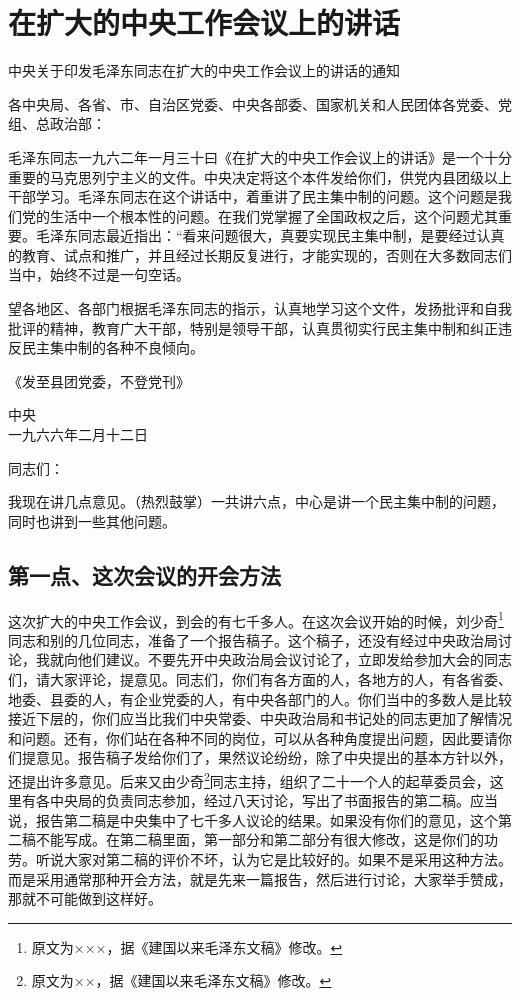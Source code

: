 \section[在扩大的中央工作会议上的讲话（一九六二年一月三十日）]{在扩大的中央工作会议上的讲话}

\begin{yinyong}
{\noindent\Large\centering 中央关于印发毛泽东同志在扩大的中央工作会议上的讲话的通知 \par}

各中央局、各省、市、自治区党委、中央各部委、国家机关和人民团体各党委、党组、总政治部：

毛泽东同志一九六二年一月三十曰《在扩大的中央工作会议上的讲话》是一个十分重要的马克思列宁主义的文件。中央决定将这个本件发给你们，供党内县团级以上干部学习。毛泽东同志在这个讲话中，着重讲了民主集中制的问题。这个问题是我们党的生活中一个根本性的问题。在我们党掌握了全国政权之后，这个问题尤其重要。毛泽东同志最近指出：“看来问题很大，真要实现民主集中制，是要经过认真的教育、试点和推广，并且经过长期反复进行，才能实现的，否则在大多数同志们当中，始终不过是一句空话。

望各地区、各部门根据毛泽东同志的指示，认真地学习这个文件，发扬批评和自我批评的精神，教育广大干部，特别是领导干部，认真贯彻实行民主集中制和纠正违反民主集中制的各种不良倾向。

《发至县团党委，不登党刊》

{\raggedleft 中央\\一九六六年二月十二日\par}
\end{yinyong}

{\noindent 同志们：}

我现在讲几点意见。（热烈鼓掌）一共讲六点，中心是讲一个民主集中制的问题，同时也讲到一些其他问题。

\subsection{第一点、这次会议的开会方法}

这次扩大的中央工作会议，到会的有七千多人。在这次会议开始的时候，刘少奇\footnote{原文为×××，据《建国以来毛泽东文稿》修改。}同志和别的几位同志，准备了一个报告稿子。这个稿子，还没有经过中央政治局讨论，我就向他们建议。不要先开中央政治局会议讨论了，立即发给参加大会的同志们，请大家评论，提意见。同志们，你们有各方面的人，各地方的人，有各省委、地委、县委的人，有企业党委的人，有中央各部门的人。你们当中的多数人是比较接近下层的，你们应当比我们中央常委、中央政治局和书记处的同志更加了解情况和问题。还有，你们站在各种不同的岗位，可以从各种角度提出问题，因此要请你们提意见。报告稿子发给你们了，果然议论纷纷，除了中央提出的基本方针以外，还提出许多意见。后来又由少奇\footnote{原文为××，据《建国以来毛泽东文稿》修改。}同志主持，组织了二十一个人的起草委员会，这里有各中央局的负责同志参加，经过八天讨论，写出了书面报告的第二稿。应当说，报告第二稿是中央集中了七千多人议论的结果。如果没有你们的意见，这个第二稿不能写成。在第二稿里面，第一部分和第二部分有很大修改，这是你们的功劳。听说大家对第二稿的评价不坏，认为它是比较好的。如果不是采用这种方法。而是采用通常那种开会方法，就是先来一篇报告，然后进行讨论，大家举手赞成，那就不可能做到这样好。

